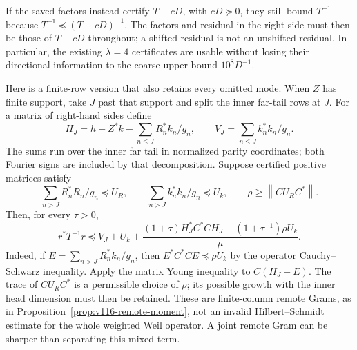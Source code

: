 \documentclass[11pt]{article}
\theoremstyle{remark}
\newcommand{\norm}[1]{\left\lVert #1\right\rVert}
\begin{document}
If the saved factors instead certify $T-cD$, with $cD\succeq0$,
they still bound $T^{-1}$ because
$T^{-1}\preceq(T-cD)^{-1}$. The factors and residual in the
right side must then be those of $T-cD$ throughout; a shifted
residual is not an unshifted residual. In particular, the existing
$\lambda=4$ certificates are usable without losing their directional
information to the coarse upper bound $10^8D^{-1}$.

Here is a finite-row version that also retains every omitted mode.
When $Z$ has finite support, take $J$ past that support and split the inner far-tail rows
at $J$. For a matrix of right-hand sides define
\[
 H_J=h-Z^*k-\sum_{n\le J}R_n^*k_n/g_n,
 \qquad V_J=\sum_{n\le J}k_n^*k_n/g_n.
\]
The sums run over the inner far tail in normalized parity coordinates;
both Fourier signs are included by that decomposition. Suppose certified positive
matrices satisfy
\[
 \sum_{n>J}R_n^*R_n/g_n\preceq U_R,
 \qquad \sum_{n>J}k_n^*k_n/g_n\preceq U_k,
 \qquad \rho\ge\norm{CU_RC^*}.
\]
Then, for every $\tau>0$,
\begin{equation}\label{eq:v120-structured-finite-rows}
 r^*T^{-1}r\preceq V_J+U_k+
 \frac{(1+\tau)H_J^*C^*CH_J+
             (1+\tau^{-1})\rho U_k}{\mu}.
\end{equation}
Indeed, if $E=\sum_{n>J}R_n^*k_n/g_n$, then
$E^*C^*CE\preceq\rho U_k$ by the operator Cauchy--Schwarz
inequality. Apply the matrix Young inequality to $C(H_J-E)$.
The trace of $CU_RC^*$ is a permissible choice of $\rho$;
its possible growth with the inner head dimension must then be
retained. These are finite-column remote Grams, as in
Proposition~\ref{prop:v116-remote-moment}, not an invalid
Hilbert--Schmidt estimate for the whole weighted Weil operator.
A joint remote Gram can be sharper than separating this mixed term.
\end{document}
